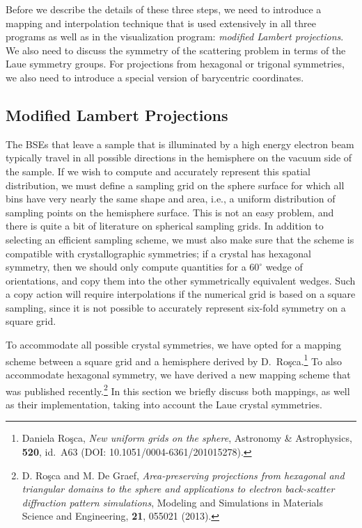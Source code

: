 \documentclass[DIV=calc, paper=letter, fontsize=11pt]{scrartcl}	 %
\begin{document}
Before we describe the details of these three steps, we need to introduce a mapping and interpolation technique that is used extensively in all
three programs as well as in the visualization program: \textit{modified Lambert projections}.  We also need to discuss the 
symmetry of the scattering problem in terms of the Laue symmetry groups. For projections from hexagonal or trigonal symmetries, we 
also need to introduce a special version of barycentric coordinates.

\subsection{Modified Lambert Projections \label{sec:Lambert}}
The BSEs that leave a sample that is illuminated by a high energy electron beam typically travel in all possible directions in the hemisphere
on the vacuum side of the sample.  If we wish to compute and accurately represent this spatial distribution, we must define a sampling grid 
on the sphere surface for which all bins have very nearly the same shape and area, i.e., a uniform distribution of sampling points 
on the hemisphere surface.  This is not an easy problem, and there is quite a bit of literature on spherical sampling grids.  In addition 
to selecting an efficient sampling scheme, we must also make sure that the scheme is compatible with crystallographic symmetries; if a crystal
has hexagonal symmetry, then we should only compute quantities for a $60^{\circ}$ wedge of orientations, and copy them into the other symmetrically
equivalent wedges.  Such a copy action will require interpolations if the numerical grid is based on a square sampling, since it is not possible
to accurately represent six-fold symmetry on a square grid.  

To accommodate all possible crystal symmetries, we have opted for a mapping scheme between a square grid and a hemisphere derived by D.\ 
Ro\c{s}ca.\footnote{Daniela Ro\c{s}ca, \textit{New uniform grids on the sphere}, Astronomy \& Astrophysics, \textbf{520}, 
id.\ A63 (DOI: 10.1051/0004-6361/201015278).}
To also accommodate hexagonal symmetry, we have derived a new mapping scheme that was published recently.\footnote{D. Ro\c{s}ca and M. De Graef, 
\textit{Area-preserving projections from hexagonal and triangular domains to the sphere and applications to electron back-scatter diffraction pattern simulations}, 
Modeling and Simulations in Materials Science and Engineering, \textbf{21}, 055021 (2013).}  In this section we briefly discuss both mappings, as well 
as their implementation, taking into account the Laue crystal symmetries.
\end{document}
